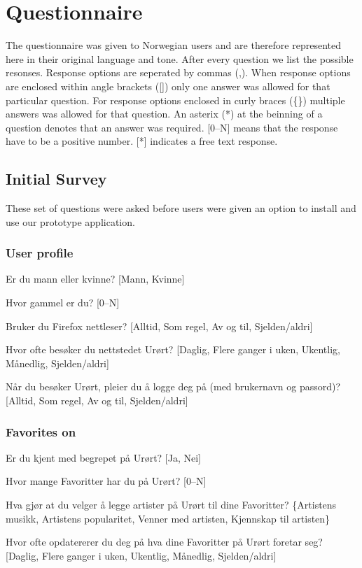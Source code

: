 \chapter{Questionnaire}
\label{appendix:questionnaire}

The questionnaire was given to Norwegian users and are therefore represented
here in their original language and tone. After every question we list the
possible resonses. Response options are seperated by commas (,). When response
options are enclosed within angle brackets ([]) only one answer was allowed
for that particular question. For response options enclosed in curly braces
(\{\}) multiple answers was allowed for that question. An asterix (*) at the
beinning of a question denotes that an answer was required. [0--N] means that
the response have to be a positive number. [*] indicates a free text response.

\section{Initial Survey}

These set of questions were asked before users were given an option to install
and use our prototype application.

\subsection{User profile}

\begin{enum}
  \item Er du mann eller kvinne?
    [Mann, Kvinne]
  \item Hvor gammel er du?
    [0--N]
  \item * Bruker du Firefox nettleser?
    [Alltid, Som regel, Av og til, Sjelden/aldri]
  \item * Hvor ofte besøker du nettstedet Urørt?
    [Daglig, Flere ganger i uken, Ukentlig, Månedlig, Sjelden/aldri]
  \item * Når du besøker Urørt, pleier du å logge deg på (med brukernavn
    og passord)?
    [Alltid, Som regel, Av og til, Sjelden/aldri]
\end{enum}

\subsection{Favorites on \urort{}}

\begin{enum}
  \item * Er du kjent med begrepet  på Urørt?
    [Ja, Nei]
  \item Hvor mange Favoritter har du på Urørt?
    [0--N]
  \item Hva gjør at du velger å legge artister på Urørt til dine Favoritter?
    \{Artistens musikk, Artistens popularitet, Venner med artisten,
    Kjennskap til artisten\}
  \item  Hvor ofte opdatererer du deg på hva dine Favoritter på Urørt
    foretar seg?
    [Daglig, Flere ganger i uken, Ukentlig, Månedlig, Sjelden/aldri]
\end{enum}

